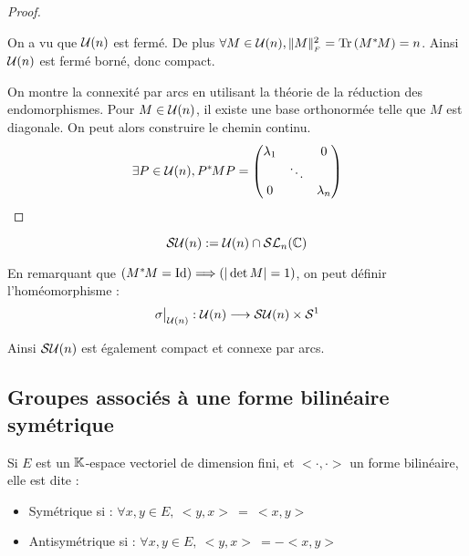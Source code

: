 \begin{proof}\ 

On a vu que $\mathcal{U}(n)$ est fermé. De plus $\forall M\in\mathcal{U}(n), |\negthinspace\hspace{0.07em}|M|\negthinspace\hspace{0.07em}|_{{}_F}^2 = \operatorname{Tr\,}
(M^{*}\hspace{-0.1em}M) = n$. Ainsi $\mathcal{U}(n)$ est fermé borné, donc compact.

On montre la connexité par arcs en utilisant la théorie de la réduction des
endomorphismes. Pour $M\in\mathcal{U}(n)$, il existe une base orthonormée telle que $M$
est diagonale. On peut alors construire le chemin continu.
\begin{displaymath}\exists P\in\mathcal{U}(n), P^{*}\hspace{-0.1em}MP =
\begin{pmatrix}         \lambda_1 & &0\\
                          & \ddots & \\
                      0 & &\lambda_n \end{pmatrix}\end{displaymath}
\end{proof}

\begin{defi}
 
\begin{displaymath} \mathcal{S}\mathcal{U}(n) := \mathcal{U}(n) \cap \mathcal{SL}_n(\mathbb{C}) \end{displaymath} 
\end{defi}


\begin{example}[Remarque]
 En remarquant que $(M^{*}\hspace{-0.1em}M=\operatorname{Id}) \Longrightarrow (|\det M| = 1)$, on peut définir
l'homéomorphisme :
\begin{displaymath} \sigma\big|_{\mathcal{U}(n)} : \mathcal{U}(n) \longrightarrow \mathcal{S}\mathcal{U}(n)\times
\mathcal{S}^1 \end{displaymath}

Ainsi $\mathcal{S}\mathcal{U}(n)$ est également compact et connexe par arcs.
\end{example}


\vspace{0.5em}
\subsection{Groupes associés à une forme bilinéaire symétrique}
\vspace{0.5em}

\begin{defi}
 
Si $E$ est un $\mathbb{K}$-espace vectoriel de dimension fini, et $<\cdotp,\cdotp>$ un
forme bilinéaire, elle est dite :
\begin{itemize}
 \item Symétrique si : $\forall x,y \in E,\ <y,x>\ =\ <x,y>$
 \item Antisymétrique si : $\forall x,y \in E,\ <y,x>\ = -<x,y>$
\end{itemize}
\end{defi}

